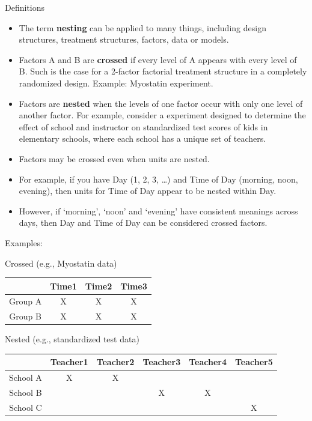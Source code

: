 \documentclass[
  9pt,
  ignorenonframetext,
]{beamer}
\begin{document}
\begin{frame}{Definitions}
\protect\hypertarget{definitions}{}
\begin{itemize}
\item
  The term \textbf{nesting} can be applied to many things, including
  design structures, treatment structures, factors, data or models.
\item
  Factors A and B are \textbf{crossed} if every level of A appears with
  every level of B. Such is the case for a 2-factor factorial treatment
  structure in a completely randomized design. Example: Myostatin
  experiment.
\item
  Factors are \textbf{nested} when the levels of one factor occur with
  only one level of another factor. For example, consider a experiment
  designed to determine the effect of school and instructor on
  standardized test scores of kids in elementary schools, where each
  school has a unique set of teachers.
\item
  Factors may be crossed even when units are nested.
\item
  For example, if you have Day (1, 2, 3, \ldots) and Time of Day
  (morning, noon, evening), then units for Time of Day appear to be
  nested within Day.
\item
  However, if `morning', `noon' and `evening' have consistent meanings
  across days, then Day and Time of Day can be considered crossed
  factors.
\end{itemize}
\end{frame}

\begin{frame}{Examples:}
\protect\hypertarget{examples}{}
\begin{block}{Crossed (e.g., Myostatin data)}
\protect\hypertarget{crossed-e.g.-myostatin-data}{}
\begin{longtable}[]{@{}cccc@{}}
\toprule
& Time1 & Time2 & Time3\tabularnewline
\midrule
\endhead
Group A & X & X & X\tabularnewline
Group B & X & X & X\tabularnewline
\bottomrule
\end{longtable}
\end{block}

\begin{block}{Nested (e.g., standardized test data)}
\protect\hypertarget{nested-e.g.-standardized-test-data}{}
\begin{longtable}[]{@{}cccccc@{}}
\toprule
& Teacher1 & Teacher2 & Teacher3 & Teacher4 & Teacher5\tabularnewline
\midrule
\endhead
School A & X & X & & &\tabularnewline
School B & & & X & X &\tabularnewline
School C & & & & & X\tabularnewline
\bottomrule
\end{longtable}
\end{block}
\end{frame}
\end{document}
